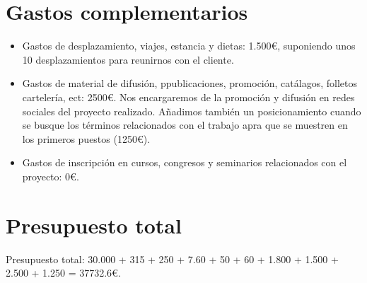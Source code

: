 \section{Gastos complementarios}
\begin{itemize}
	\item Gastos de desplazamiento, viajes, estancia y dietas: 1.500\euro,\hspace{1pt} suponiendo unos 10 desplazamientos para reunirnos con el cliente.
	\item Gastos de material de difusión, ppublicaciones, promoción, catálagos, folletos cartelería, ect: 2500\euro \hspace{1pt}. Nos encargaremos de la promoción y difusión en redes sociales del proyecto realizado. Añadimos también un posicionamiento cuando se busque los términos relacionados con el trabajo apra que se muestren en los primeros puestos (1250\euro).
	\item Gastos de inscripción en cursos, congresos y seminarios relacionados con el proyecto: 0\euro.
\end{itemize}



\section{Presupuesto total}
Presupuesto total: 30.000 + 315 + 250 + 7.60 + 50 + 60 + 1.800 + 1.500 + 2.500 + 1.250 = 37732.6\euro.

